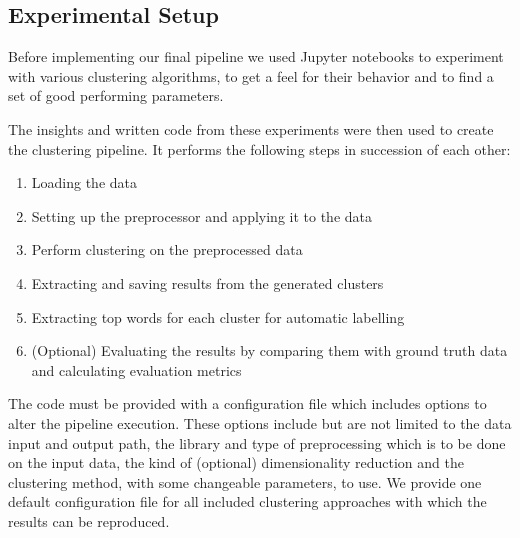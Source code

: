 \subsection{Experimental Setup}
Before implementing our final pipeline we used Jupyter notebooks to experiment with various clustering algorithms, to get a feel for their behavior and to find a set of good performing parameters.

The insights and written code from these experiments were then used to create the clustering pipeline. It performs the following steps in succession of each other:
\begin{enumerate}
    \item Loading the data
    \item Setting up the preprocessor and applying it to the data
    \item Perform clustering on the preprocessed data
    \item Extracting and saving results from the generated clusters
    \item Extracting top words for each cluster for automatic labelling
    \item (Optional) Evaluating the results by comparing them with ground truth data and calculating evaluation metrics
\end{enumerate}

The code must be provided with a configuration file which includes options to alter the pipeline execution. These options include but are not limited to the data input and output path, the library and type of preprocessing which is to be done on the input data, the kind of (optional) dimensionality reduction and the clustering method, with some changeable parameters, to use.
We provide one default configuration file for all included clustering approaches with which the results can be reproduced. 